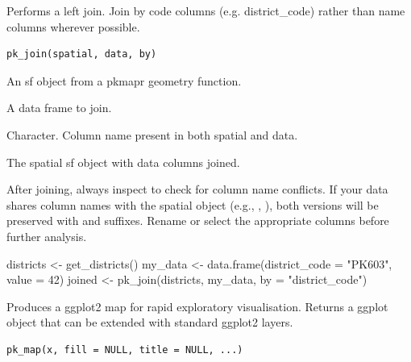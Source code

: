 \documentclass[a4paper]{book}
\begin{document}
%
\begin{Description}
Performs a left join. Join by code columns (e.g. district\_code) rather than name columns
wherever possible.
\end{Description}
%
\begin{Usage}
\begin{verbatim}
pk_join(spatial, data, by)
\end{verbatim}
\end{Usage}
%
\begin{Arguments}
\begin{ldescription}
\item[\code{spatial}] An sf object from a pkmapr geometry function.

\item[\code{data}] A data frame to join.

\item[\code{by}] Character. Column name present in both spatial and data.
\end{ldescription}
\end{Arguments}
%
\begin{Value}
The spatial sf object with data columns joined.
\end{Value}
%
\begin{Note}
After joining, always inspect  to check for column name
conflicts. If your data shares column names with the spatial object (e.g.,
, ), both versions will be preserved with
 and  suffixes. Rename or select the appropriate columns before
further analysis.
\end{Note}
%
\begin{Examples}
\begin{ExampleCode}

  districts <- get_districts()
  my_data   <- data.frame(district_code = "PK603", value = 42)
  joined    <- pk_join(districts, my_data, by = "district_code")

\end{ExampleCode}
\end{Examples}
%
\begin{Description}
Produces a ggplot2 map for rapid exploratory visualisation.
Returns a ggplot object that can be extended with standard ggplot2 layers.
\end{Description}
%
\begin{Usage}
\begin{verbatim}
pk_map(x, fill = NULL, title = NULL, ...)
\end{verbatim}
\end{Usage}
\end{document}
